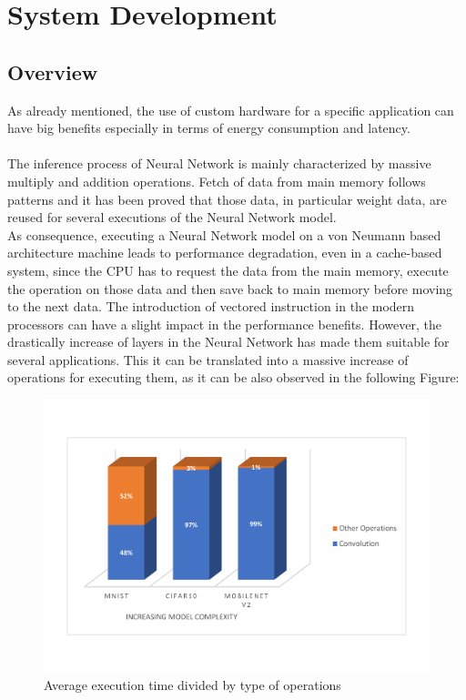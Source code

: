 \chapter{System Development}

\section{Overview}
As already mentioned, the use of custom hardware for a specific application can have big benefits especially in terms of energy consumption and latency.\\\\
The inference process of Neural Network is mainly characterized by massive multiply and addition operations. Fetch of data from main memory follows patterns and it has been proved that those data, in particular weight data, are reused for several executions of the Neural Network model.\\
As consequence, executing a Neural Network model on a von Neumann based architecture machine leads to performance degradation, even in a cache-based system, since the CPU has to request the data from the main memory, execute the operation on those data and then save back to main memory before moving to the next data. The introduction of vectored instruction in the modern processors can have a slight impact in the performance benefits. However, the drastically increase of layers in the Neural Network has made them suitable for several applications. This it can be translated into a massive increase of operations for executing them, as it can be also observed in the following Figure:
\begin{figure}[!htbp]
\centering
\captionsetup{justification=centering}
\includegraphics[scale=0.3]{./figure/exec_time.pdf}
\caption{Average execution time divided by type of operations}
\label{fig:exec}
\end{figure}

